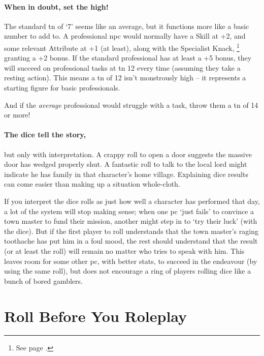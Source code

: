 \begin{multicols}{2}
\paragraph{When in doubt, set the  high!}
The standard \gls{tn} of `7' seems like an average, but it functions more like a basic number to add to.
A professional \gls{npc} would normally have a Skill at +2, and some relevant Attribute at +1 (at least), along with the Specialist Knack,%
\footnote{See page \pageref{specialist}.}
granting a +2 bonus.
If the standard professional has at least a +5 bonus, they will succeed on professional tasks at \gls{tn} 12 every time (assuming they take a resting action).
This means a \gls{tn} of 12 isn't monstrously high -- it represents a starting figure for basic professionals.

And if the \emph{average} professional would struggle with a task, throw them a \gls{tn} of 14 or more!

\paragraph{The dice tell the story,} but only with interpretation.
A crappy roll to open a door suggests the massive door has wedged properly shut.
A fantastic roll to talk to the local lord might indicate he has family in that character's home village.
Explaining dice results can come easier than making up a situation whole-cloth.

If you interpret the dice rolls as just how well a character has performed that day, a lot of the system will stop making sense; when one \gls{pc} `just fails' to convince a town master to fund their mission, another might step in to `try their luck' (with the dice).
But if the first player to roll understands that the town master's raging toothache has put him in a foul mood, the rest should understand that the result (or at least the roll) will remain no matter who tries to speak with him.
This leaves room for some other \gls{pc}, with better stats, to succeed in the endeavour (by using the same roll), but does not encourage a ring of players rolling dice like a bunch of bored gamblers.

\end{multicols}

\section[Social Rolls]{Roll Before You Roleplay}

